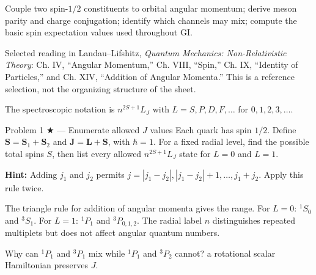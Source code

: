 \documentclass[11pt]{article}
\begin{document}

\begin{goals}
Couple two spin-$1/2$ constituents to orbital angular momentum; derive meson
parity and charge conjugation; identify which channels may mix; compute the
basic spin expectation values used throughout GI.
\end{goals}
\begin{reading}
Selected reading in Landau--Lifshitz, \emph{Quantum Mechanics: Non-Relativistic
Theory}: Ch. IV, ``Angular Momentum,'' Ch. VIII, ``Spin,'' Ch. IX, ``Identity
of Particles,'' and Ch. XIV, ``Addition of Angular Momenta.'' This is a
reference selection, not the organizing structure of the sheet.
\end{reading}

The spectroscopic notation is $n^{2S+1}L_J$ with $L=S,P,D,F,\ldots$ for
$0,1,2,3,\ldots$.


\begin{problem}{Problem 1 ★ — Enumerate allowed $J$ values}
Each quark has spin $1/2$. Define $\bm S=\bm S_1+\bm S_2$ and
$\bm J=\bm L+\bm S$, with $\hbar=1$.
For a fixed radial level, find the possible total spins $S$, then list every
allowed $n^{2S+1}L_J$ state for $L=0$ and $L=1$.

\textbf{Hint:} Adding $j_1$ and $j_2$ permits
$j=|j_1-j_2|,|j_1-j_2|+1,\ldots,j_1+j_2$. Apply this rule twice.
\end{problem}
\begin{solution}
The triangle rule for addition of angular momenta gives the range. For $L=0$:
$^1S_0$ and $^3S_1$. For $L=1$: $^1P_1$ and
$^3P_{0,1,2}$. The radial label $n$ distinguishes repeated multiplets but does
not affect angular quantum numbers.
\end{solution}
\begin{quiz}
Why can $^1P_1$ and $^3P_1$ mix while $^1P_1$ and $^3P_2$ cannot? \answer a
rotational scalar Hamiltonian preserves $J$.
\end{quiz}
\end{document}

